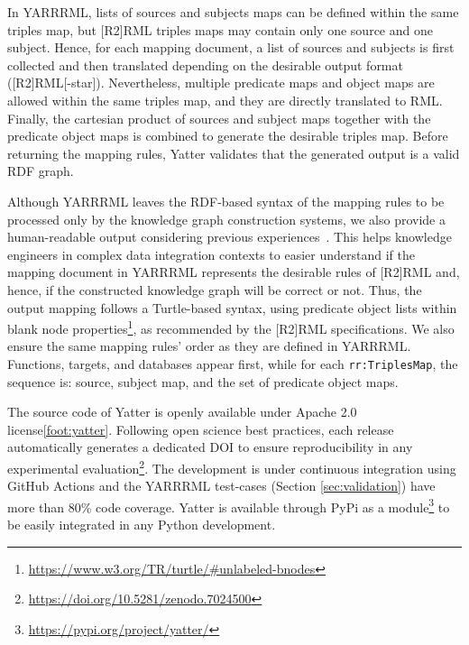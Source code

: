 In YARRRML, lists of sources and subjects maps can be defined within the same triples map, but [R2]RML triples maps may contain only one source and one subject. 
Hence, for each mapping document, a list of sources and subjects is first collected and then translated depending on the desirable output format ([R2]RML[-star]). 
Nevertheless, multiple predicate maps and object maps are allowed within the same triples map, and they are directly translated to RML.
Finally, the cartesian product of sources and subject maps together with the predicate object maps is combined to generate the desirable triples map.
Before returning the mapping rules, Yatter validates that the generated output is a valid RDF graph.

Although YARRRML leaves the RDF-based syntax of the mapping rules to be processed only by the knowledge graph construction systems, we also provide a human-readable output considering previous experiences~\citep{chaves2022systematic,corcho2021high,chaves2020bench}.
This helps knowledge engineers in complex data integration contexts to easier understand if the mapping document in YARRRML represents the desirable rules of [R2]RML and, hence, if the constructed knowledge graph will be correct or not. 
Thus, the output mapping follows a Turtle-based syntax, using predicate object lists within blank node properties\footnote{\url{https://www.w3.org/TR/turtle/\#unlabeled-bnodes}}, as recommended by the [R2]RML specifications.
We also ensure the same mapping rules' order as they are defined in YARRRML. 
Functions, targets, and databases appear first, while for each \texttt{rr:TriplesMap}, the sequence is: source, subject map, and the set of predicate object maps.

The source code of Yatter is openly available under Apache 2.0 license\cref{foot:yatter}.
Following open science best practices, each release automatically generates a dedicated DOI to ensure reproducibility in any experimental evaluation\footnote{\url{https://doi.org/10.5281/zenodo.7024500}}. 
The development is under continuous integration using GitHub Actions and the YARRRML test-cases (Section \ref{sec:validation}) have more than 80\% code coverage. 
Yatter is available through PyPi as a module\footnote{\url{https://pypi.org/project/yatter/}} to be easily integrated in any Python development. %



